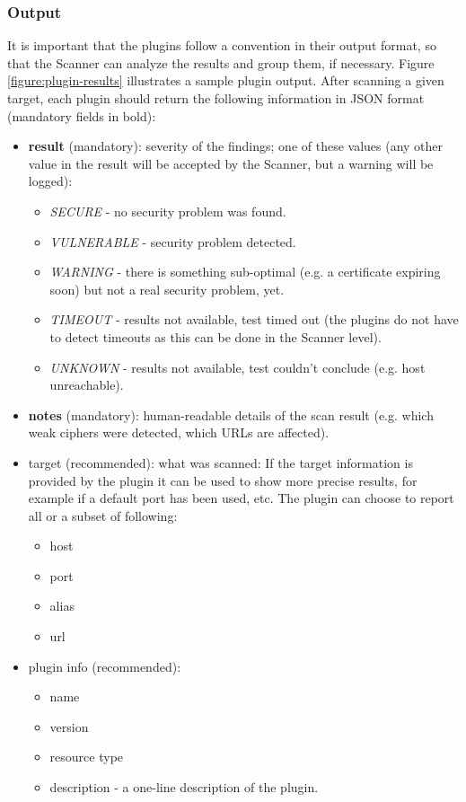 \subsubsection{Output}
It is important that the plugins follow a convention in their output format, so that the Scanner can analyze the results and group them, if necessary. Figure \ref{figure:plugin-results} illustrates a sample plugin output. After scanning a given target, each plugin should return the following information in JSON format (mandatory fields in bold): 
\begin{itemize}


   \item \textbf{result} (mandatory): severity of the findings; one of these values (any other value in the result will be accepted by the Scanner, but a warning will be logged):
    \begin{itemize}
    

        \item \textit{SECURE} - no security problem was found.
        \item  \textit{VULNERABLE} - security problem detected.
        \item  \textit{WARNING} - there is something sub-optimal (e.g. a certificate expiring soon) but not a real security problem, yet.
        \item  \textit{TIMEOUT} - results not available, test timed out (the plugins do not have to detect timeouts as this can be done in the Scanner level).
        \item  \textit{UNKNOWN} - results not available, test couldn't conclude (e.g. host unreachable).
      
            \end{itemize}
\item      \textbf{notes} (mandatory): human-readable details of the scan result (e.g. which weak ciphers were detected, which URLs are affected).
\item      target (recommended): what was scanned: If the target information is provided by the plugin it can be used to show more precise results, for example if a default port has been used, etc. The plugin can choose to report all or a subset of following:
\begin{itemize}


\item        host
\item    port
\item    alias
\item    url 
\end{itemize}
\item    plugin info (recommended):
\begin{itemize}
\item        name
\item        version
\item    resource type
\item    description - a one-line description of the plugin. 
\end{itemize}
\end{itemize}



